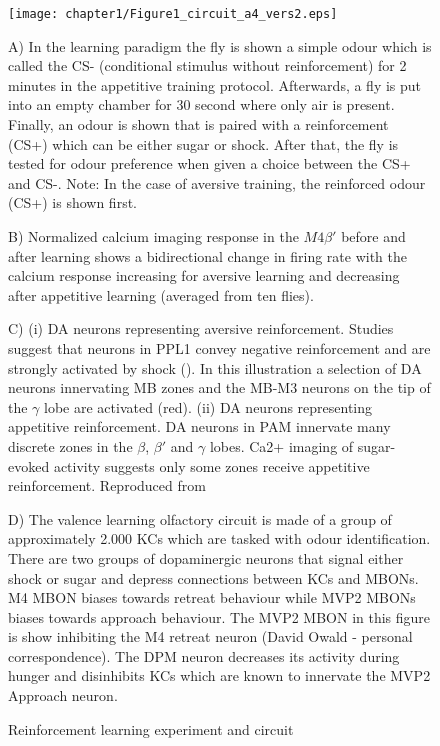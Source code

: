 \begin{figure}[H]
%
\texttt{[image: chapter1/Figure1\_circuit\_a4\_vers2.eps]}


\caption[The olfactory reinforcement learning circuit and experiment]{%
Reinforcement learning experiment and circuit %
}


A) In the learning paradigm the fly is shown a simple odour which
is called the CS- (conditional stimulus without reinforcement) for
2 minutes in the appetitive training protocol. Afterwards, a fly is
put into an empty chamber for 30 second where only air is present.
Finally, an odour is shown that is paired with a reinforcement (CS+)
which can be either sugar or shock. After that, the fly is tested
for odour preference when given a choice between the CS+ and CS-.
Note: In the case of aversive training, the reinforced odour (CS+)
is shown first. 

B) Normalized calcium imaging response in the $M4\beta'$ before and
after learning shows a bidirectional change in firing rate with the
calcium response increasing for aversive learning and decreasing after
appetitive learning (averaged from ten flies).

C) (i) DA neurons representing aversive reinforcement. Studies suggest
that neurons in PPL1 convey negative reinforcement and are strongly
activated by shock (\citealp{Perisse:2013fpa}). In this illustration
a selection of DA neurons innervating MB zones and the MB-M3 neurons
on the tip of the $\gamma$ lobe are activated (red). (ii) DA neurons
representing appetitive reinforcement. DA neurons in PAM innervate
many discrete zones in the $\beta$, $\beta'$ and $\gamma$ lobes.
Ca2+ imaging of sugar-evoked activity suggests only some zones receive
appetitive reinforcement. Reproduced from \citet{Waddell:2013fu}

D) The valence learning olfactory circuit is made of a group of approximately
2.000 KCs which are tasked with odour identification. There are two
groups of dopaminergic neurons that signal either shock or sugar and
depress connections between KCs and MBONs. M4 MBON biases towards
retreat behaviour while MVP2 MBONs biases towards approach behaviour.
The MVP2 MBON in this figure is show inhibiting the M4 retreat neuron
(David Owald - personal correspondence). The DPM neuron decreases
its activity during hunger and disinhibits KCs which are known to
innervate the MVP2 Approach neuron. %
\end{figure}

